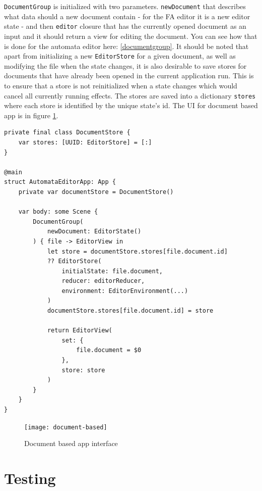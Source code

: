 \lstinline{DocumentGroup} is initialized with two parameters. \lstinline{newDocument} that describes what data should a new document contain - for the FA editor it is a new editor state - and then \lstinline{editor} closure that has the currently opened document as an input and it should return a view for editing the document. You can see how that is done for the automata editor here: \ref{documentgroup}. It should be noted that apart from initializing a new \lstinline{EditorStore} for a given document, as well as modifying the file when the state changes, it is also desirable to save stores for documents that have already been opened in the current application run. This is to ensure that a store is not reinitialized when a state changes which would cancel all currently running effects. The stores are saved into a dictionary \lstinline{stores} where each store is identified by the unique state's id. The UI for document based app is in figure \ref{document-based-interface}.

\begin{lstlisting}[caption={DocumentGroup scene}, label=documentgroup]
private final class DocumentStore {
    var stores: [UUID: EditorStore] = [:]
}

@main
struct AutomataEditorApp: App {
    private var documentStore = DocumentStore()
    
    var body: some Scene {
        DocumentGroup(
            newDocument: EditorState()
        ) { file -> EditorView in
            let store = documentStore.stores[file.document.id] 
            ?? EditorStore(
                initialState: file.document,
                reducer: editorReducer,
                environment: EditorEnvironment(...)
            )
            documentStore.stores[file.document.id] = store
            
            return EditorView(
                set: {
                    file.document = $0
                },
                store: store
            )
        }
    }
}
\end{lstlisting}

\begin{figure}
    \texttt{[image: document-based]}
    \caption{Document based app interface}\label{document-based-interface}
\end{figure}

\chapter{Testing}
\label{chap:testing}

